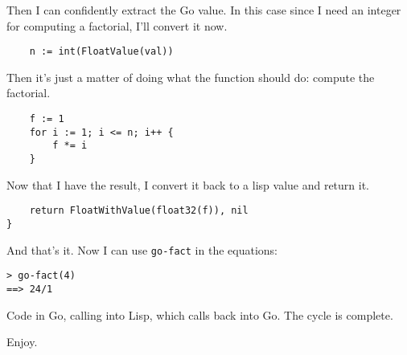 \documentclass{scrartcl}
\begin{document}
Then I can confidently extract the Go value. In this case since I need
an integer for computing a factorial, I'll convert it now.

\begin{verbatim}    n := int(FloatValue(val))
\end{verbatim}

Then it's just a matter of doing what the function should do: compute
the factorial.

\begin{verbatim}    f := 1
    for i := 1; i <= n; i++ {
        f *= i
    }
\end{verbatim}

Now that I have the result, I convert it back to a lisp value and return it.

\begin{verbatim}    return FloatWithValue(float32(f)), nil
}
\end{verbatim}

And that's it. Now I can use \texttt{go-fact} in the equations:

\begin{verbatim}> go-fact(4)
==> 24/1
\end{verbatim}

Code in Go, calling into Lisp, which calls back into Go. The cycle is
complete.

Enjoy.
\end{document}
